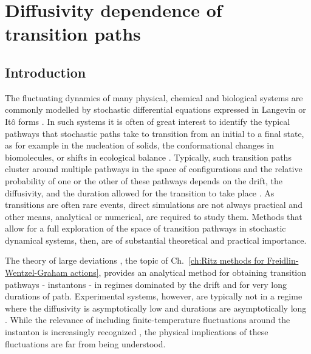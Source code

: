 \chapter{Diffusivity dependence of transition paths} \label{ch:Diffusivity dependence of transition paths}

\section{Introduction}


The fluctuating dynamics of many physical, chemical and biological
systems are commonly modelled by stochastic differential equations
expressed in Langevin or Itô forms \citep{kampenStochasticProcessesPhysics2011a, gardinerStochasticMethodsHandbook2010a, riskenFokkerPlanckEquationMethods2012a, bharucha-reidElementsTheoryMarkov2012a}.
In such systems it is often of great interest to identify the typical
pathways that stochastic paths take to transition from an initial
to a final state, as for example in the nucleation of solids, the
conformational changes in biomolecules, or shifts in ecological balance
\citep{faccioliDominantPathwaysProtein2006a, demarcoPhaseTransitionModel2001a, gardnerConstructionGeneticToggle2000a, mangelBarrierTransitionsDriven1994a, wolynesNavigatingFoldingRoutes1995a, huangMolecularMathematicalBasis2012a, paninskiMostLikelyVoltage2006a, noltingBallsCupsQuasipotentials2016a, leeFindingMultipleReaction2017a}.
Typically, such transition paths cluster around multiple pathways
in the space of configurations and the relative probability of one
or the other of these pathways depends on the drift, the diffusivity,
and the duration allowed for the transition to take place \citep{onsagerFluctuationsIrreversibleProcesses1953a, bachFunctionalsPathsDiffusion1977a, itoProbabilisticConstructionLagrangean1978b, ikedaStochasticDifferentialEquations2014a}.
As transitions are often rare events, direct simulations are not always
practical and other means, analytical or numerical, are required to
study them. Methods that allow for a full exploration of the space
of transition pathways in stochastic dynamical systems, then, are
of substantial theoretical and practical importance.

The theory of large deviations \citep{wentzellSmallRandomPerturbations1970, stratonovichMarkovMethodsTheory1989a, grahamMacroscopicPotentialsBifurcations1989a, arnoldStochasticDifferentialEquations1974a}, the topic of Ch.~\ref{ch:Ritz methods for Freidlin-Wentzel-Graham actions},
provides an analytical method for obtaining transition pathways -
instantons - in regimes dominated by the drift and for very long durations
of path. Experimental systems, however, are typically not in a regime
where the diffusivity is asymptotically low and durations are asymptotically
long \citep{gladrowExperimentalMeasurementRelative2021a}. While the
relevance of including finite-temperature fluctuations around the
instanton \citep{gelfandIntegrationFunctionalSpaces1960a} is increasingly
recognized \citep{nickelsenNoiseCorrectionLarge2022, corazzaNormalizedGaussianPath2020b, luGaussianApproximationsTransition2017a},
the physical implications of these fluctuations are far from being
understood.

